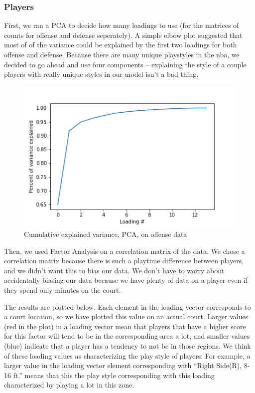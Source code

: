 \documentclass[]{article}
\begin{document}
\hypertarget{players}{%
\subsubsection{Players}\label{players}}

First, we ran a PCA to decide how many loadings to use (for the matrices
of counts for offense and defense seperately). A simple elbow plot
suggested that most of of the variance could be explained by the first
two loadings for both offense and defense. Because there are many unique
playstyles in the nba, we decided to go ahead and use four components --
explaining the style of a couple players with really unique styles in
our model isn't a bad thing.

\begin{figure}
\centering
\includegraphics{cum_pca_offense.png}
\caption{Cumulative explained variance, PCA, on offense data}
\end{figure}

Then, we used Factor Analysis on a correlation matrix of the data. We
chose a correlation matrix because there is such a playtime difference
between players, and we didn't want this to bias our data. We don't have
to worry about accidentally biasing our data because we have plenty of
data on a player even if they spend only minutes on the court.

The results are plotted below. Each element in the loading vector
corresponds to a court location, so we have plotted this value on an
actual court. Larger values (red in the plot) in a loading vector mean
that players that have a higher score for this factor will tend to be in
the corresponding area a lot, and smaller values (blue) indicate that a
player has a tendency to not be in those regions. We think of these
loading values as characterizing the play style of players: For example,
a larger value in the loading vector element corresponding with ``Right
Side(R), 8-16 ft.'' means that this the play style corresponding with
this loading characterized by playing a lot in this zone.
\end{document}
